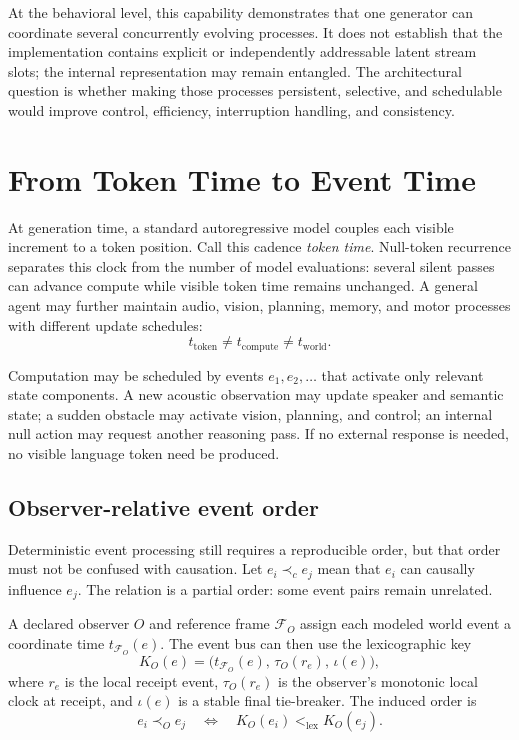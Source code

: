 \documentclass[10pt,twocolumn]{article}
\begin{document}
At the behavioral level, this capability demonstrates that one generator can coordinate several concurrently evolving processes. It does not establish that the implementation contains explicit or independently addressable latent stream slots; the internal representation may remain entangled. The architectural question is whether making those processes persistent, selective, and schedulable would improve control, efficiency, interruption handling, and consistency.

\section{From Token Time to Event Time}

At generation time, a standard autoregressive model couples each visible increment to a token position. Call this cadence \emph{token time}. Null-token recurrence separates this clock from the number of model evaluations: several silent passes can advance compute while visible token time remains unchanged. A general agent may further maintain audio, vision, planning, memory, and motor processes with different update schedules:
\begin{equation}
  t_{\mathrm{token}} \neq t_{\mathrm{compute}} \neq t_{\mathrm{world}}.
\end{equation}

Computation may be scheduled by events $e_1,e_2,\ldots$ that activate only relevant state components. A new acoustic observation may update speaker and semantic state; a sudden obstacle may activate vision, planning, and control; an internal null action may request another reasoning pass. If no external response is needed, no visible language token need be produced.

\subsection{Observer-relative event order}

Deterministic event processing still requires a reproducible order, but that order must not be confused with causation. Let $e_i \prec_c e_j$ mean that $e_i$ can causally influence $e_j$. The relation is a partial order: some event pairs remain unrelated.

A declared observer $O$ and reference frame $\mathcal F_O$ assign each modeled world event a coordinate time $t_{\mathcal F_O}(e)$. The event bus can then use the lexicographic key
\begin{equation}
  K_O(e) = \bigl(t_{\mathcal F_O}(e),\, \tau_O(r_e),\, \iota(e)\bigr),
\end{equation}
where $r_e$ is the local receipt event, $\tau_O(r_e)$ is the observer's monotonic local clock at receipt, and $\iota(e)$ is a stable final tie-breaker. The induced order is
\begin{equation}
  e_i \prec_O e_j \quad \Longleftrightarrow \quad
  K_O(e_i) <_{\mathrm{lex}} K_O(e_j).
\end{equation}
\end{document}
